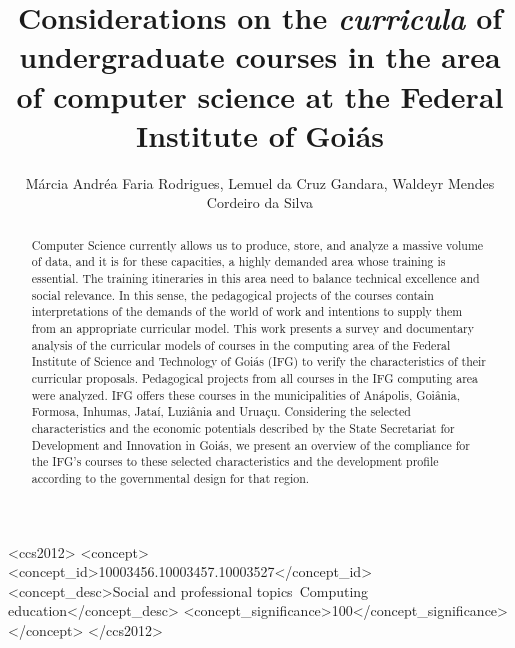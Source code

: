\documentclass[sigconf, review]{educomp}
\begin{document}
\title[Computer Science undergraduate curricula at IFG]{Considerations on the \textit{curricula} of undergraduate courses in the area of computer science at the Federal Institute of Goi\'as}

\author{Márcia Andréa Faria Rodrigues, Lemuel da Cruz Gandara, Waldeyr Mendes Cordeiro da Silva}

\renewcommand{\shortauthors}{-}

\newcommand{\showDOI}[1]{\unskip}


\begin{abstract}
Computer Science currently allows us to produce, store, and analyze a massive volume of data, and it is for these capacities, a highly demanded area whose training is essential. 
The training itineraries in this area need to balance technical excellence and social relevance. 
In this sense, the pedagogical projects of the courses contain interpretations of the demands of the world of work and intentions to supply them from an appropriate curricular model. 
This work presents a survey and documentary analysis of the curricular models of courses in the computing area of the Federal Institute of Science and Technology of Goiás (IFG) to verify the characteristics of their curricular proposals. 
Pedagogical projects from all courses in the IFG computing area were analyzed. 
IFG offers these courses in the municipalities of Anápolis, Goiânia, Formosa, Inhumas, Jataí, Luziânia and Uruaçu. Considering the selected characteristics and the economic potentials described by the State Secretariat for Development and Innovation in Goiás, we present an overview of the compliance for the IFG's courses to these selected characteristics and the development profile according to the governmental design for that region.
\end{abstract}

\begin{CCSXML}
<ccs2012>
<concept>
<concept_id>10003456.10003457.10003527</concept_id>
<concept_desc>Social and professional topics~Computing education</concept_desc>
<concept_significance>100</concept_significance>
</concept>
</ccs2012>
\end{CCSXML}
\end{document}
